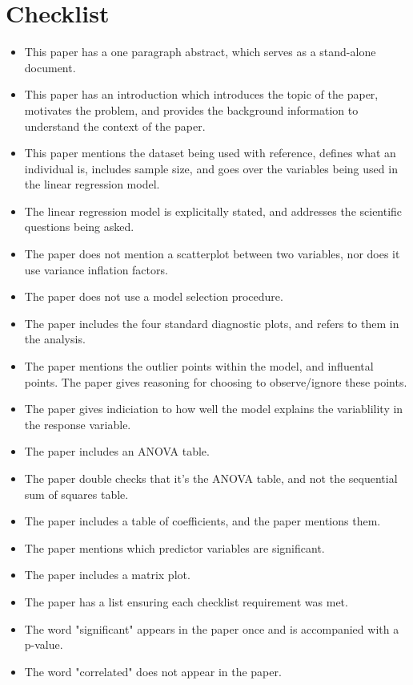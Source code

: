 \documentclass[10pt]{article}
\begin{document}
\section{Checklist}
\begin{itemize}
    \item This paper has a one paragraph abstract, which serves as a stand-alone document.
    \item This paper has an introduction which introduces the topic of the paper, motivates the problem, and provides the background information to understand the context of the paper.
    \item This paper mentions the dataset being used with reference, defines what an individual is, includes sample size, and goes over the variables being used in the linear regression model.
    \item The linear regression model is explicitally stated, and addresses the scientific questions being asked.
    \item The paper does not mention a scatterplot between two variables, nor does it use variance inflation factors.
    \item The paper does not use a model selection procedure.
    \item The paper includes the four standard diagnostic plots, and refers to them in the analysis.
    \item The paper mentions the outlier points within the model, and influental points. The paper gives reasoning for choosing to observe/ignore these points.
    \item The paper gives indiciation to how well the model explains the variablility in the response variable.
    \item The paper includes an ANOVA table.
    \item The paper double checks that it's the ANOVA table, and not the sequential sum of squares table.
    \item The paper includes a table of coefficients, and the paper mentions them.
    \item The paper mentions which predictor variables are significant.
    \item The paper includes a matrix plot.
    \item The paper has a list ensuring each checklist requirement was met.
    \item The word "significant" appears in the paper once and is accompanied with a p-value.
    \item The word "correlated" does not appear in the paper.

\end{itemize}
\end{document}
